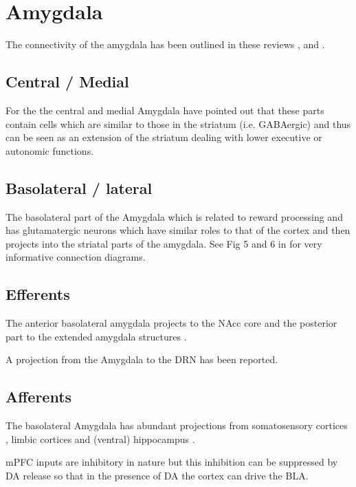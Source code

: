 \documentclass[12pt,a4paper]{article}
\begin{document}
\section{Amygdala}

The connectivity of the amygdala has been outlined in these reviews \citep{Alheid2003}, \citep{Sah2003} and \citep{Swanson1998}.

\subsection{Central / Medial}

For the  the central and medial Amygdala \citep{Swanson2003}\citep{Swanson1998} have pointed out that these parts contain cells which are similar to those in the striatum (i.e. GABAergic) and thus can be seen as an extension of the striatum dealing with lower executive or autonomic functions.

\subsection{Basolateral / lateral}

The basolateral part of the Amygdala which is related to reward processing and has glutamatergic neurons which have similar roles to that of the cortex and then projects into the striatal parts of the amygdala. See Fig 5 and 6 in \citep{Swanson1998} for very informative connection diagrams.

\subsection{Efferents}

The anterior basolateral amygdala projects to the NAcc core and the  posterior part to the extended amygdala structures  \citep{Alheid2003}.

A projection from the Amygdala to the DRN \citep{PollakDorocic2014} has been reported.

\subsection{Afferents}

The basolateral Amygdala has abundant projections from somatosensory cortices 
\citep{Swanson1998}, limbic cortices \citep{Ottersen1982} and (ventral) hippocampus \citep{Pitkanen2000}.

mPFC inputs are inhibitory in nature \citep{Rosenkranz2002} but this inhibition can be suppressed by DA release so that in the presence of DA the cortex can drive the BLA.
\end{document}
